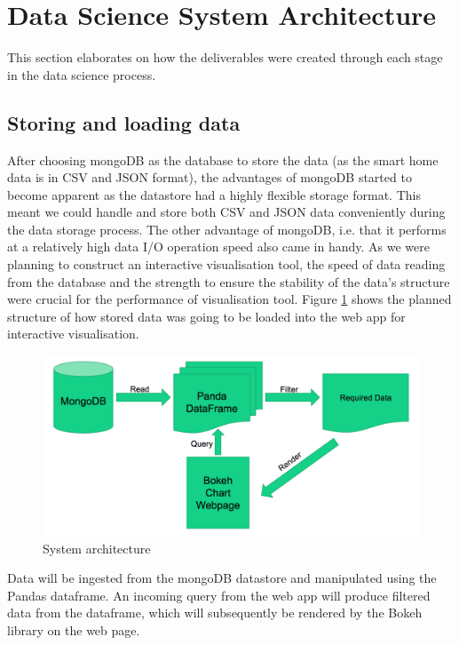 \documentclass[fleqn,10pt]{SelfArx} %
\begin{document}
\section{Data Science System Architecture}
This section elaborates on how the deliverables were created through each stage in the data science process.

	\subsection{Storing and loading data}
After choosing mongoDB as the database to store the data (as the smart home data is in CSV and JSON format), the advantages of mongoDB started to become apparent as the datastore had a highly flexible storage format. This meant we could handle and store both CSV and JSON data conveniently during the data storage process. The other advantage of mongoDB, i.e. that it performs at a relatively high data I/O operation speed also came in handy. As we were planning to construct an interactive visualisation tool, the speed of data reading from the database and the strength to ensure the stability of  the data’s structure  were crucial for the performance of visualisation tool. Figure \ref{fig:sys-arc} shows the planned structure of how stored data was going to be loaded into the web app for interactive visualisation. \\

\begin{figure}[!h] \centering
	\includegraphics[scale=0.2]{sys-arc} 
	\caption{System architecture}
	\label{fig:sys-arc}
\end{figure}

Data will be ingested from the mongoDB datastore and manipulated using the Pandas dataframe. An incoming query from the web app will produce filtered data from the dataframe, which will subsequently be rendered by the Bokeh library on the web page. \\
\end{document}
